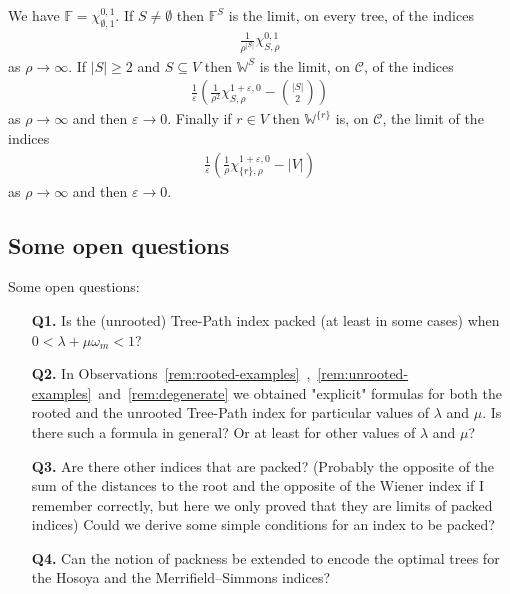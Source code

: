 \documentclass[11 pt]{modarticle}
\newcommand{\wmin}{\omega_m}
\newcommand{\size}[1]{|#1|}
\newcommand{\tclass}{\mathcal{C}}
\begin{document}
We have $\mathbb{F} = \chi^{0,1}_{\emptyset, 1}$. If $S \neq \emptyset$ then $\mathbb{F}^S$ is the limit, on every tree, of the indices
\begin{eqnarray*}
	\frac{1}{\rho^{\size{S}}} \chi^{0,1}_{S,\rho}
\end{eqnarray*}
as $\rho \rightarrow \infty$. If $\size{S} \geq 2$ and $S \subseteq V$ then $\mathbb{W}^S$ is the limit, on $\tclass$, of the indices
\begin{eqnarray*}
	\frac{1}{\varepsilon}\left(\frac{1}{\rho^2} \chi^{1+\varepsilon,0}_{S,\rho} - {\size{S}\choose{2}} \right)
\end{eqnarray*}
as $\rho \rightarrow \infty$ and then $\varepsilon \rightarrow 0$. Finally if $r \in V$ then $\mathbb{W}^{\{r\}}$ is, on $\tclass$, the limit of the indices
\begin{eqnarray*}
	\frac{1}{\varepsilon}\left(\frac{1}{\rho}\chi^{1+\varepsilon,0}_{\{r\},\rho}-\size{V}\right)
\end{eqnarray*}
as $\rho \rightarrow \infty$ and then $\varepsilon \rightarrow 0$.

\subsection{Some open questions}

Some open questions:
\begin{itemize}
\item[\textbf{Q1.}] Is the (unrooted) Tree-Path index packed (at least in some cases) when $0 < \lambda + \mu \wmin < 1$?
\item[\textbf{Q2.}] In Observations~\ref{rem:rooted-examples}~,~\ref{rem:unrooted-examples}~and~\ref{rem:degenerate} we obtained "explicit" formulas for both the rooted and the unrooted Tree-Path index for particular values of $\lambda$ and $\mu$. Is there such a formula in general? Or at least for other values of $\lambda$ and $\mu$?
\item[\textbf{Q3.}] Are there other indices that are packed? (Probably the opposite of the sum of the distances to the root and the opposite of the Wiener index if I remember correctly, but here we only proved that they are limits of packed indices) Could we derive some simple conditions for an index to be packed?
\item[\textbf{Q4.}] Can the notion of packness be extended to encode the optimal trees for the Hosoya and the Merrifield–Simmons\cite{andriantiana} indices?
\end{itemize}

\pagebreak
{}





\pagebreak
\appendix
\end{document}
